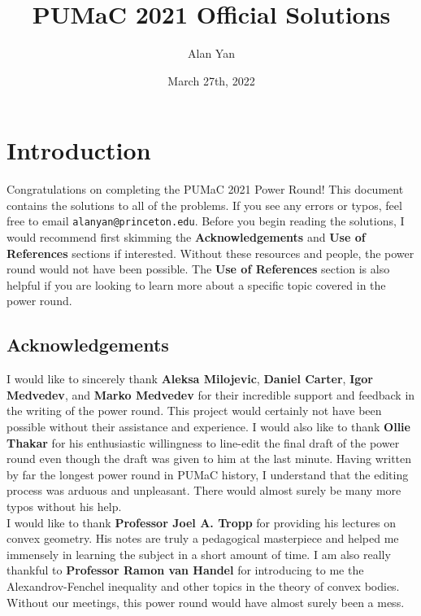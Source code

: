 \documentclass[12pt]{article}
\begin{document}
\title{PUMaC 2021 Official Solutions}
\author{Alan Yan}
\date{March 27th, 2022}
\maketitle
\tableofcontents
\newpage 

\section{Introduction}

Congratulations on completing the PUMaC 2021 Power Round! This document contains the solutions to all of the problems. If you see any errors or typos, feel free to email \texttt{alanyan@princeton.edu}. Before you begin reading the solutions, I would recommend first skimming the \textbf{Acknowledgements} and \textbf{Use of References} sections if interested. Without these resources and people, the power round would not have been possible. The \textbf{Use of References} section is also helpful if you are looking to learn more about a specific topic covered in the power round.  

\subsection{Acknowledgements}

I would like to sincerely thank \textbf{Aleksa Milojevic}, \textbf{Daniel Carter}, \textbf{Igor Medvedev}, and \textbf{Marko Medvedev} for their incredible support and feedback in the writing of the power round. This project would certainly not have been possible without their assistance and experience. I would also like to thank \textbf{Ollie Thakar} for his enthusiastic willingness to line-edit the final draft of the power round even though the draft was given to him at the last minute. Having written by far the longest power round in PUMaC history, I understand that the editing process was arduous and unpleasant. There would almost surely be many more typos without his help. \\


I would like to thank \textbf{Professor Joel A. Tropp} for providing his lectures on convex geometry. His notes are truly a pedagogical masterpiece and helped me immensely in learning the subject in a short amount of time. I am also really thankful to \textbf{Professor Ramon van Handel} for introducing to me the Alexandrov-Fenchel inequality and other topics in the theory of convex bodies. Without our meetings, this power round would have almost surely been a mess. \\
\end{document}

